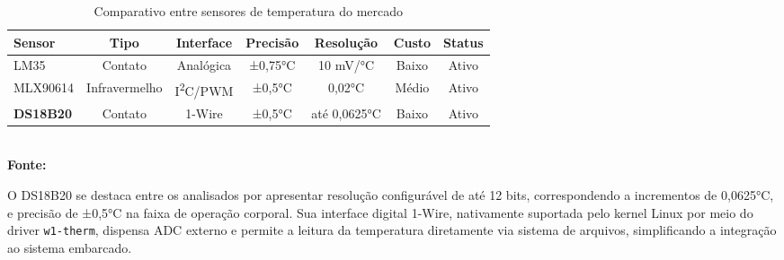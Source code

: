 \begin{table}[H]
\centering
\caption{Comparativo entre sensores de temperatura do mercado}
\label{tableComparativoSensoresTemp}
\begin{tabular}{ |l|c|c|c|c|c|c| }
    \hline
    \textbf{Sensor} & \textbf{Tipo} & \textbf{Interface} & \textbf{Precisão} & \textbf{Resolução} & \textbf{Custo} & \textbf{Status} \\
    \hline
    LM35    & Contato & Analógica  & ±0,75°C & 10 mV/°C   & Baixo  & Ativo \\
    MLX90614 & Infravermelho & I\textsuperscript{2}C/PWM & ±0,5°C  & 0,02°C     & Médio  & Ativo \\
    \textbf{DS18B20} & Contato & 1-Wire & ±0,5°C  & até 0,0625°C & Baixo  & Ativo \\
    \hline
\end{tabular}
{\footnotesize\\ \textbf{Fonte: \cite{lm35} \cite{mlx90614} \cite{ds18b20}}}
\end{table}

O DS18B20 se destaca entre os analisados por apresentar resolução configurável de até 12 bits, correspondendo a incrementos de 0,0625°C, e precisão de ±0,5°C na faixa de operação corporal. Sua interface digital 1-Wire, nativamente suportada pelo kernel Linux por meio do driver \texttt{w1-therm}, dispensa ADC externo e permite a leitura da temperatura diretamente via sistema de arquivos, simplificando a integração ao sistema embarcado.










